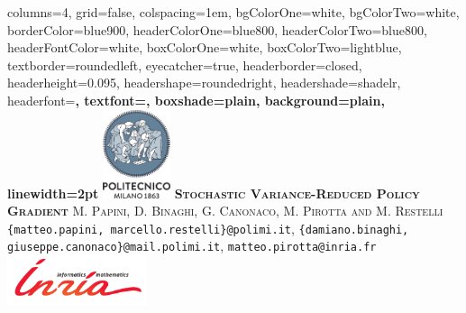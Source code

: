 \documentclass[landscape,a0paper,fontscale=0.32]{baposter}
\begin{document}
\begin{poster}%
  {
  columns=4,
  grid=false,
  colspacing=1em,
  bgColorOne=white,
  bgColorTwo=white,
  borderColor=blue900,
  headerColorOne=blue800,
  headerColorTwo=blue800,
  headerFontColor=white,
  boxColorOne=white,
  boxColorTwo=lightblue,
  textborder=roundedleft,
  eyecatcher=true,
  headerborder=closed,
  headerheight=0.095\textheight,
  headershape=roundedright,
  headershade=shadelr,
  headerfont=\large\bf\textsc, %
  textfont={\setlength{\parindent}{1.5em}},
  boxshade=plain,
  background=plain,
  linewidth=2pt
  }
  {\includegraphics[height=7.0em]{./pics/polilogo/logoPoliBlue_poster.png}}
  {\bf\textsc{Stochastic Variance-Reduced Policy Gradient}\vspace{0.1em}}
  {\textsc{M. Papini, D. Binaghi, G. Canonaco, M. Pirotta and M. Restelli}\\ 
  {\normalsize \texttt{\{matteo.papini, marcello.restelli\}@polimi.it}},
  {\normalsize \texttt{\{damiano.binaghi, giuseppe.canonaco\}@mail.polimi.it}},  {\normalsize \texttt{matteo.pirotta@inria.fr}}
  }
  {%
    \includegraphics[height=4em]{./pics/inria_sc}
  }

    \newcommand{\colouredcircle}{%
      \tikz{\useasboundingbox (-0.2em,-0.32em) rectangle(0.2em,0.32em); \draw[draw=black,fill=lightblue,line width=0.03em] (0,0) circle(0.18em);}}


\end{poster}
\end{document}
